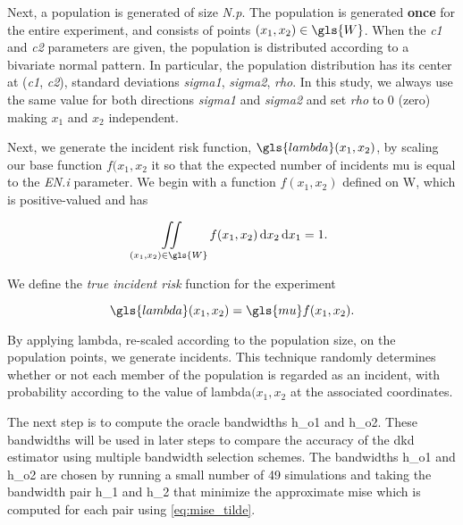Next, a population is generated of size \textit{N.p}.
The population is generated \textbf{once} for the entire experiment, and consists of points \((x_1, x_2) \in \gls{W}\).
When the \textit{c1} and \textit{c2} parameters are given, the population is distributed according to a bivariate normal pattern.
In particular, the population distribution has its center at (\textit{c1}, \textit{c2}),
standard deviations \textit{sigma1}, \textit{sigma2}, \textit{rho}.
In this study, we always use the same value for both directions \textit{sigma1} and \textit{sigma2} and set \textit{rho} to 0 (zero) making \(x_1\) and \(x_2\) independent.

Next, we generate the incident risk function, \(\gls{lambda}(x_1, x_2)\), by scaling our base function \(f(x_1, x_2\) it so that the expected number of incidents \gls{mu} is equal to the \textit{EN.i} parameter.
We begin with a function \(f(x_1, x_2)\) defined on \gls{W}, which is positive-valued and has 

\begin{equation*}
    \iint\limits_{(x_1,x_2)\in\gls{W}} {f(x_1, x_2) \diff{x_2} \diff{x_1}} = 1
    \text{.}
\end{equation*}

We define the \textit{true incident risk} function for the experiment

\begin{equation}
    \gls{lambda}(x_1, x_2) = \gls{mu} f(x_1, x_2) \text{.}
\end{equation}

By applying \gls{lambda}, re-scaled according to the population size, on the population points, we generate incidents.
This technique randomly determines whether or not each member of the population is regarded as an incident, with probability according to the value of \gls{lambda}\((x_1, x_2\) at the associated coordinates.

The next step is to compute the \gls{oracle} bandwidths \gls{h_o1} and \gls{h_o2}.
These bandwidths will be used in later steps to compare the accuracy of the \gls{dkd} estimator using multiple bandwidth selection schemes.
The bandwidths \gls{h_o1} and \gls{h_o2} are chosen by running a small number of 49 simulations and taking the bandwidth pair \gls{h_1} and \gls{h_2} that minimize the approximate \gls{mise} which is computed for each pair using \cref{eq:mise_tilde}.

